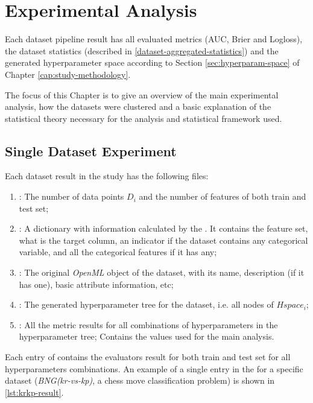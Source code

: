 \chapter{Experimental Analysis}
\label{cap:experimental-analysis}

Each dataset pipeline result has all evaluated metrics (AUC, Brier and Logloss), the dataset statistics (described in \ref{dataset-aggregated-statistics}) and the generated hyperparameter space according to Section \ref{sec:hyperparam-space} of Chapter \ref{cap:study-methodology}.

The focus of this Chapter is to give an overview of the main experimental analysis, how the datasets were clustered and a basic explanation of the statistical theory necessary for the analysis and statistical framework used.


\section{Single Dataset Experiment}
\label{sec:single-dataset}

Each dataset result in the study has the following files:

\begin{enumerate}
    \item \textbf{}: The number of data points $D_i$ and the number of features of both train and test set;
    \item \textbf{}: A dictionary with information calculated by the . It contains the feature set, what is the target column, an indicator if the dataset contains any categorical variable, and all the categorical features if it has any;
    \item \textbf{}: The original \textit{OpenML} object of the dataset, with its name, description (if it has one), basic attribute information, etc;
    \item \textbf{}: The generated hyperparameter tree for the dataset, i.e. all nodes of $Hspace_i$;
    \item \textbf{}: All the metric results for all combinations of hyperparameters in the hyperparameter tree; Contains the values used for the main analysis.
\end{enumerate}

Each entry of  contains the evaluators result for both train and test set for all hyperparameters combinations. An example of a single entry in the  for a specific dataset (\textit{BNG(kr-vs-kp)}, a chess move classification problem) is shown in \ref{lst:krkp-result}.

